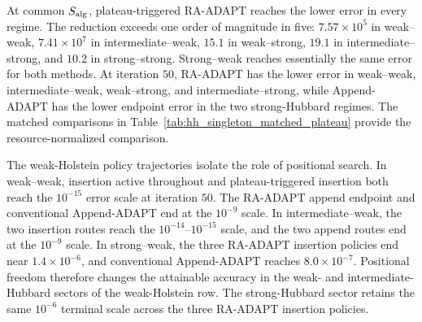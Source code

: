 \documentclass[
  reprint,
  amsmath,
  amssymb,
  aps,
  pra,
  nofootinbib,
  superscriptaddress,
  floatfix
]{revtex4-2}
\begin{document}
At common \(S_{\rm alg}\), plateau-triggered RA-ADAPT reaches the lower error
in every regime. The reduction exceeds one order of magnitude in five:
\(7.57\times10^5\) in weak--weak, \(7.41\times10^7\) in
intermediate--weak, \(15.1\) in weak--strong, \(19.1\) in
intermediate--strong, and \(10.2\) in strong--strong. Strong--weak reaches
essentially the same error for both methods. At iteration \(50\), RA-ADAPT has
the lower error in weak--weak, intermediate--weak, weak--strong, and
intermediate--strong, while Append-ADAPT has the lower endpoint error in the
two strong-Hubbard regimes. The matched comparisons in
Table~\ref{tab:hh_singleton_matched_plateau} provide the resource-normalized
comparison.

The weak-Holstein policy trajectories isolate the role of positional search.
In weak--weak, insertion active throughout and plateau-triggered insertion
both reach the \(10^{-15}\) error scale at iteration \(50\). The RA-ADAPT
append endpoint and conventional Append-ADAPT end at the \(10^{-9}\) scale.
In intermediate--weak, the two insertion routes reach the
\(10^{-14}\)--\(10^{-15}\) scale, and the two append routes end at the
\(10^{-9}\) scale. In strong--weak, the three RA-ADAPT insertion policies end
near \(1.4\times10^{-6}\), and conventional Append-ADAPT reaches
\(8.0\times10^{-7}\). Positional freedom therefore changes the attainable
accuracy in the weak- and intermediate-Hubbard sectors of the weak-Holstein
row. The strong-Hubbard sector retains the same \(10^{-6}\) terminal scale
across the three RA-ADAPT insertion policies.
\end{document}
